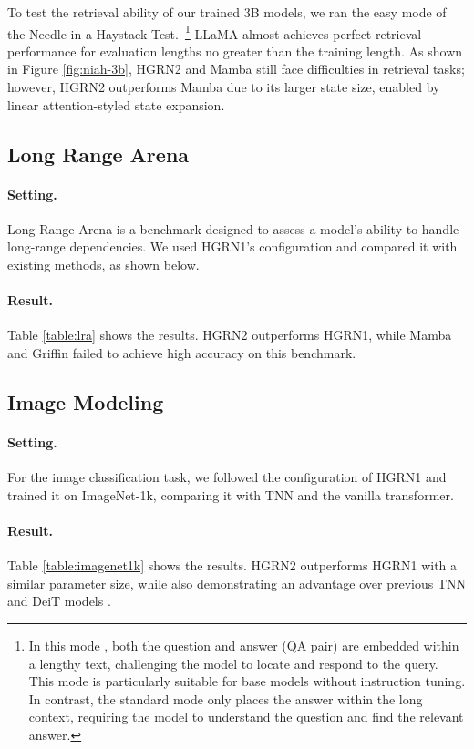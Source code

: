 To test the retrieval ability of our trained 3B models, we ran the easy mode of the Needle in a Haystack Test.~\footnote{In this mode \citep{LLMTest_NeedleInAHaystack_HFModel,shen2024scalinglawslinearcomplexity}, both the question and answer (QA pair) are embedded within a lengthy text, challenging the model to locate and respond to the query. This mode is particularly suitable for base models without instruction tuning. In contrast, the standard mode only places the answer within the long context, requiring the model to understand the question and find the relevant answer.}  LLaMA almost achieves perfect retrieval performance for evaluation lengths no greater than the training length. As shown in Figure \ref{fig:niah-3b}, HGRN2 and Mamba still face difficulties in retrieval tasks; however, HGRN2 outperforms Mamba due to its larger state size, enabled by linear attention-styled state expansion.

\subsection{Long Range Arena}

\paragraph{Setting.} Long Range Arena \citep{lra} is a benchmark designed to assess a model's ability to handle long-range dependencies. We used HGRN1's configuration and compared it with existing methods, as shown below.

\paragraph{Result.} Table \ref{table:lra}
 shows the results. HGRN2 outperforms HGRN1, while Mamba and Griffin failed to achieve high accuracy on this benchmark.

\subsection{Image Modeling}

\paragraph{Setting.} For the image classification task, we followed the configuration of HGRN1 and trained it on ImageNet-1k, comparing it with TNN and the vanilla transformer.

\paragraph{Result.} Table \ref{table:imagenet1k} shows the results. HGRN2 outperforms HGRN1 with a similar parameter size, while also demonstrating an advantage over previous TNN \citep{qin2023toeplitz} and DeiT models \citep{pmlr-v139-touvron21a}.

